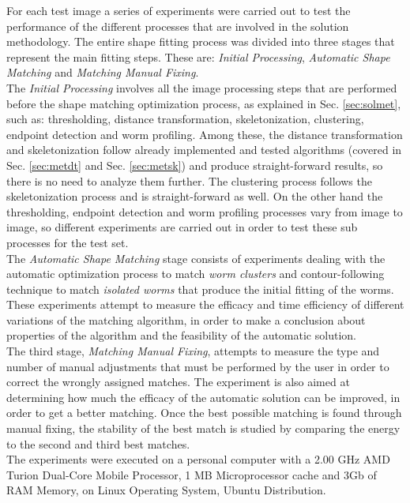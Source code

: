 For each test image a series of experiments were carried out to test the performance of
the different processes that are involved in the solution methodology. The entire 
shape fitting process was divided into three stages that represent the 
main fitting steps. These are: \emph{Initial Processing}, \emph{Automatic Shape Matching} and
\emph{Matching Manual Fixing}.\\

The \emph{Initial Processing} involves all the image processing steps that are performed 
before the shape matching optimization process, as explained in Sec. \ref{sec:solmet},
such as: thresholding, distance transformation, skeletonization, 
clustering, endpoint detection and worm profiling. Among these, the distance transformation
and skeletonization follow already implemented and tested algorithms (covered in Sec. \ref{sec:metdt}
and Sec. \ref{sec:metsk}) and produce straight-forward results, so there is no need to analyze them further.
The clustering process follows the skeletonization process and is straight-forward as well.
On the other hand the thresholding, endpoint detection and worm profiling processes vary 
from image to image, so different experiments are carried out in order to test these sub processes
for the test set.\\

The \emph{Automatic Shape Matching} stage consists of experiments dealing with the automatic
optimization process to match \emph{worm clusters} and contour-following technique to match 
\emph{isolated worms} that produce the initial fitting of the worms. These 
experiments attempt to measure the efficacy and time efficiency of different variations of the
matching algorithm, in order to make a conclusion about properties of the algorithm and the feasibility 
of the automatic solution.\\
The third stage, \emph{Matching Manual Fixing}, attempts to measure the type and number of 
manual adjustments that must be performed by the user in order to correct the 
wrongly assigned matches. The experiment is also 
aimed at determining how much the efficacy of the automatic solution can be improved, in
order to get a better matching. Once the best possible matching is found through manual fixing,
the stability of the best match is studied by comparing the energy to the second and third best
matches.\\

The experiments were executed on a personal computer with a 2.00 GHz AMD Turion 
Dual-Core Mobile Processor, 1 MB Microprocessor cache and 3Gb of RAM Memory, 
on Linux Operating System, Ubuntu Distribution.

